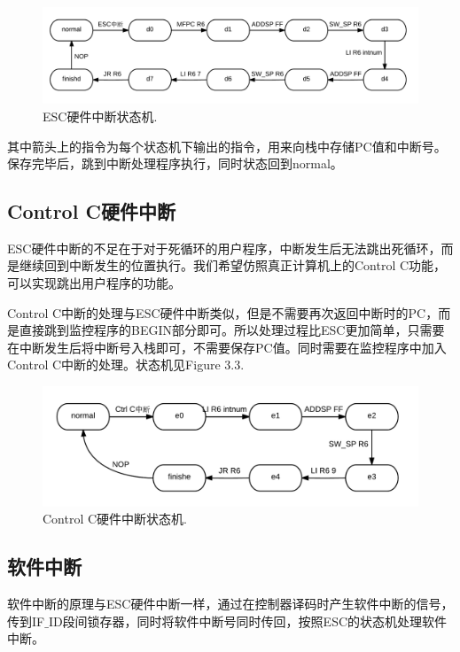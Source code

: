 \begin{figure}[H]
  \includegraphics[width=\linewidth]{Figures/escint.png}
  \caption{ESC硬件中断状态机.}
\end{figure}

其中箭头上的指令为每个状态机下输出的指令，用来向栈中存储PC值和中断号。保存完毕后，跳到中断处理程序执行，同时状态回到normal。

\subsection{Control C硬件中断}

ESC硬件中断的不足在于对于死循环的用户程序，中断发生后无法跳出死循环，而是继续回到中断发生的位置执行。我们希望仿照真正计算机上的Control C功能，可以实现跳出用户程序的功能。

Control C中断的处理与ESC硬件中断类似，但是不需要再次返回中断时的PC，而是直接跳到监控程序的BEGIN部分即可。所以处理过程比ESC更加简单，只需要在中断发生后将中断号入栈即可，不需要保存PC值。同时需要在监控程序中加入Control C中断的处理。状态机见Figure 3.3.

\begin{figure}[H]
  \includegraphics[width=\linewidth]{Figures/ctrl_c.png}
  \caption{Control C硬件中断状态机.}
\end{figure}

\subsection{软件中断}

软件中断的原理与ESC硬件中断一样，通过在控制器译码时产生软件中断的信号，传到IF$\_$ID段间锁存器，同时将软件中断号同时传回，按照ESC的状态机处理软件中断。

